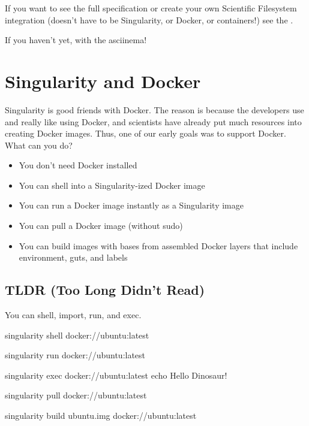 \documentclass[letterpaper,10pt,english]{sphinxmanual}
\begin{document}
If you want to see the full specification or create your own
Scientific Filesystem integration (doesn’t have to be Singularity, or
Docker, or containers!) see the .

If you haven’t yet,  with the
asciinema!


\chapter{Singularity and Docker}
\label{\detokenize{singularity_and_docker:singularity-and-docker}}\label{\detokenize{singularity_and_docker:id1}}\label{\detokenize{singularity_and_docker::doc}}
Singularity is good friends with Docker. The reason is because the
developers use and really like using Docker, and scientists have already
put much resources into creating Docker images. Thus, one of our early
goals was to support Docker. What can you do?
\begin{itemize}
\item {} 
You don’t need Docker installed

\item {} 
You can shell into a Singularity-ized Docker image

\item {} 
You can run a Docker image instantly as a Singularity image

\item {} 
You can pull a Docker image (without sudo)

\item {} 
You can build images with bases from assembled Docker layers that
include environment, guts, and labels

\end{itemize}


\section{TLDR (Too Long Didn’t Read)}
\label{\detokenize{singularity_and_docker:tldr-too-long-didnt-read}}
You can shell, import, run, and exec.

%
\begin{sphinxVerbatim}[commandchars=\\\{\}]
singularity shell docker://ubuntu:latest

singularity run docker://ubuntu:latest

singularity exec docker://ubuntu:latest echo \PYGZdq{}Hello Dinosaur!\PYGZdq{}


singularity pull docker://ubuntu:latest

singularity build ubuntu.img docker://ubuntu:latest
\end{sphinxVerbatim}
\end{document}
